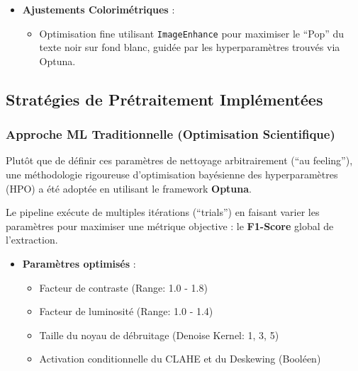 \documentclass[
  letterpaper,
  DIV=11,
  numbers=noendperiod]{scrartcl}
\providecommand{\tightlist}{%
  \setlength{\itemsep}{0pt}\setlength{\parskip}{0pt}}
\begin{document}
\begin{itemize}
  \begin{itemize}
  \tightlist
  \item
    \emph{Problème} : L'égalisation d'histogramme classique ``brûle''
    les zones claires. Sur une photo de facture avec des ombres (ex:
    prise avec un smartphone), le contraste n'est pas uniforme.
  \item
    \emph{Solution} : CLAHE améliore le contraste \emph{localement} sur
    des tuiles (8x8 pixels), permettant de révéler du texte caché dans
    l'ombre sans surexposer le reste du document.
  \end{itemize}
\item
  \textbf{Ajustements Colorimétriques} :

  \begin{itemize}
  \tightlist
  \item
    Optimisation fine utilisant \texttt{ImageEnhance} pour maximiser le
    ``Pop'' du texte noir sur fond blanc, guidée par les hyperparamètres
    trouvés via Optuna.
  \end{itemize}
\end{itemize}

\subsection{Stratégies de Prétraitement
Implémentées}\label{stratuxe9gies-de-pruxe9traitement-impluxe9mentuxe9es}

\subsubsection{Approche ML Traditionnelle (Optimisation
Scientifique)}\label{approche-ml-traditionnelle-optimisation-scientifique}

Plutôt que de définir ces paramètres de nettoyage arbitrairement (``au
feeling''), une méthodologie rigoureuse d'optimisation bayésienne des
hyperparamètres (HPO) a été adoptée en utilisant le framework
\textbf{Optuna}.

Le pipeline exécute de multiples itérations (``trials'') en faisant
varier les paramètres pour maximiser une métrique objective : le
\textbf{F1-Score} global de l'extraction.

\begin{itemize}
\tightlist
\item
  \textbf{Paramètres optimisés} :

  \begin{itemize}
  \tightlist
  \item
    Facteur de contraste (Range: 1.0 - 1.8)
  \item
    Facteur de luminosité (Range: 1.0 - 1.4)
  \item
    Taille du noyau de débruitage (Denoise Kernel: 1, 3, 5)
  \item
    Activation conditionnelle du CLAHE et du Deskewing (Booléen)
  \end{itemize}
\end{itemize}
\end{document}
